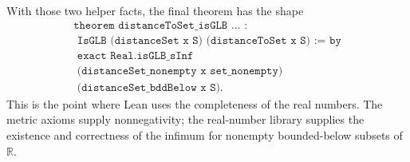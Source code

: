 \begin{remark*}
With those two helper facts, the final theorem has the shape
\[
\begin{gathered}
  \texttt{theorem distanceToSet\_isGLB ... :}\\
  \texttt{\ \ IsGLB (distanceSet x S) (distanceToSet x S) := by}\\
  \texttt{\ \ exact Real.isGLB\_sInf}\\
  \texttt{\ \ \ \ (distanceSet\_nonempty x set\_nonempty)}\\
  \texttt{\ \ \ \ (distanceSet\_bddBelow x S).}
\end{gathered}
\]
This is the point where Lean uses the completeness of the real numbers. The
metric axioms supply nonnegativity; the real-number library supplies the
existence and correctness of the infimum for nonempty bounded-below subsets of
\(\mathbb{R}\).
\end{remark*}

